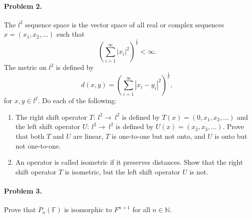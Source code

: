 \documentclass{article}
\begin{document}
\paragraph*{Problem 2.}	The $l^{2}$ sequence space is the vector space of all real or complex sequences $x=(x_{1},x_{2},\ldots)$ such that
\[
\left(\sum_{i=1}^{\infty}|x_{i}|^{2}\right)^{\frac{1}{2}}<\infty.
\]
The metric on $l^{2}$ is defined by
\[
d(x,y)=\left(\sum_{i=1}^{\infty}|x_{i}-y_{i}|^{2}\right)^{\frac{1}{2}},
\]
for $x,y\in l^{2}$. Do each of the following:
\begin{enumerate}[(i.)]
\item	The right shift operator $T\colon~l^{2}\rightarrow~l^{2}$ is defined by $T(x)=(0,x_{1},x_{2},\ldots)$ and the left shift operator $U\colon~l^{2}\rightarrow~l^{2}$ is defined by $U(x)=(x_{2},x_{3},\ldots)$. Prove that both $T$ and $U$ are linear, $T$ is one-to-one but not onto, and $U$ is onto but not one-to-one.
\item	An operator is called isometric if it preserves distances. Show that the right shift operator $T$ is isometric, but the left shift operator $U$ is not. 
\end{enumerate}

\paragraph*{Problem 3.}	Prove that $P_{n}(\mathbb{F})$ is isomorphic to $F^{n+1}$ for all $n\in\mathbb{N}$. 
\end{document}
